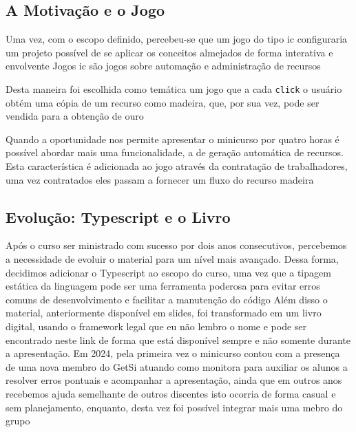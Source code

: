 \subsection{A Motivação e o Jogo}
Uma vez, com o escopo definido, percebeu-se que um jogo do tipo \gls{ic} configuraria um projeto possível de se aplicar os conceitos almejados de forma interativa e envolvente  Jogos \gls{ic} são jogos sobre automação e administração de recursos 

Desta maneira foi escolhida como temática um jogo que a cada \texttt{click} o usuário obtém uma cópia de um recurso como madeira, que, por sua vez, pode ser vendida para a obtenção de ouro 

Quando a oportunidade nos permite apresentar o minicurso por quatro horas é possível abordar mais uma funcionalidade, a de geração automática de recursos. Esta característica é adicionada ao jogo através da contratação de trabalhadores, uma vez contratados eles passam a fornecer um fluxo do recurso madeira 
\subsection{Evolução: Typescript e o Livro}
Após o curso ser ministrado com sucesso por dois anos consecutivos, percebemos a necessidade de evoluir o material para um nível mais avançado. Dessa forma, decidimos adicionar o Typescript ao escopo do curso, uma vez que a tipagem estática da linguagem pode ser uma ferramenta poderosa para evitar erros comuns de desenvolvimento e facilitar a manutenção do código 
Além disso o material, anteriormente disponível em slides, foi transformado em um livro digital, usando o framework legal que eu não lembro o nome  e pode ser encontrado neste link de forma que está disponível sempre e não somente durante a apresentação.
Em 2024, pela primeira vez o minicurso contou com a presença de uma nova membro do GetSi atuando como monitora para auxiliar os alunos a resolver erros pontuais e acompanhar a apresentação, ainda que em outros anos recebemos ajuda semelhante de outros discentes isto ocorria de forma casual e sem planejamento, enquanto, desta vez foi possível integrar mais uma mebro do grupo 
